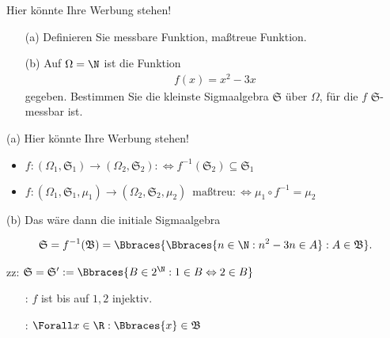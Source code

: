\begin{exercise}

Hier könnte Ihre Werbung stehen!

\begin{itemize}
  \item[(a)] Definieren Sie messbare Funktion, maßtreue Funktion.
  \item[(b)] Auf $\Omega = \N$ ist die Funktion
  \begin{align*}
    f(x) = x^2 - 3x
  \end{align*}
  gegeben. Bestimmen Sie die kleinste Sigmaalgebra $\mathfrak{S}$ über $\Omega$, für die $f$ $\mathfrak{S}$-messbar ist.
\end{itemize}

\end{exercise}


\begin{solution}

(a) Hier könnte Ihre Werbung stehen!

\begin{itemize}

  \item $f: (\Omega_1, \mathfrak{S}_1) \to (\Omega_2, \mathfrak{S}_2) : \Leftrightarrow f^{-1}(\mathfrak{S}_2) \subseteq \mathfrak{S}_1$

  \item $f: (\Omega_1, \mathfrak{S}_1, \mu_1) \to (\Omega_2, \mathfrak{S}_2, \mu_2) \enspace \text{maßtreu} : \Leftrightarrow \mu_1 \circ f^{-1} = \mu_2$

\end{itemize}

(b) Das wäre dann die initiale Sigmaalgebra

\begin{align*}
  \mathfrak{S}
  =
  f^{-1}(\mathfrak{B})
  =
  \Bbraces{\Bbraces{n \in \N: n^2 - 3n \in A}: A \in \mathfrak{B}}.
\end{align*}

zz: $\mathfrak{S} = \mathfrak{S}^\prime := \Bbraces{B \in 2^\N: 1 \in B \Leftrightarrow 2 \in B}$

\begin{itemize}

  \item[\Quote{$\subseteq$}:] $f$ ist bis auf $1, 2$ injektiv.

  \item[\Quote{$\supseteq$}:] $\Forall x \in \R: \Bbraces{x} \in \mathfrak{B}$

\end{itemize}

\end{solution}
